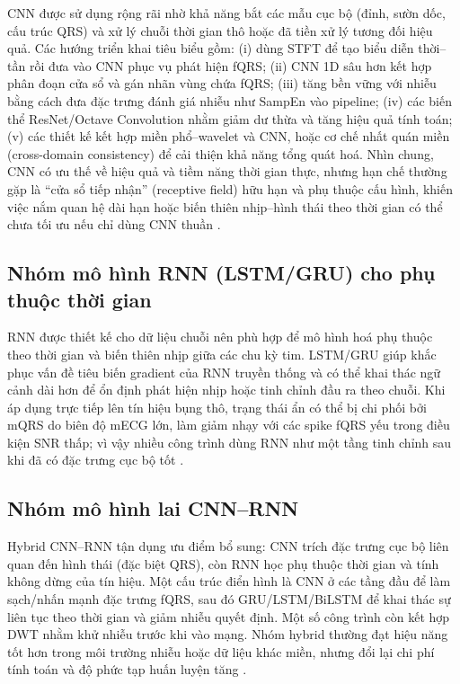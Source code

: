 \documentclass[../DoAn.tex]{subfiles}
\begin{document}
CNN được sử dụng rộng rãi nhờ khả năng bắt các mẫu cục bộ (đỉnh, sườn dốc, cấu trúc QRS) và xử lý chuỗi thời gian thô hoặc đã tiền xử lý tương đối hiệu quả. Các hướng triển khai tiêu biểu gồm: (i) dùng STFT để tạo biểu diễn thời--tần rồi đưa vào CNN phục vụ phát hiện fQRS; (ii) CNN 1D sâu hơn kết hợp phân đoạn cửa sổ và gán nhãn vùng chứa fQRS; (iii) tăng bền vững với nhiễu bằng cách đưa đặc trưng đánh giá nhiễu như SampEn vào pipeline; (iv) các biến thể ResNet/Octave Convolution nhằm giảm dư thừa và tăng hiệu quả tính toán; (v) các thiết kế kết hợp miền phổ--wavelet và CNN, hoặc cơ chế nhất quán miền (cross-domain consistency) để cải thiện khả năng tổng quát hoá. Nhìn chung, CNN có ưu thế về hiệu quả và tiềm năng thời gian thực, nhưng hạn chế thường gặp là “cửa sổ tiếp nhận” (receptive field) hữu hạn và phụ thuộc cấu hình, khiến việc nắm quan hệ dài hạn hoặc biến thiên nhịp--hình thái theo thời gian có thể chưa tối ưu nếu chỉ dùng CNN thuần
\cite{leeFetalQRSDetection2018, caoMorphologyExtractionFetal2022, zhongDeepLearningApproach2018, voEfficientRobustDeep2020}.


\subsection{Nhóm mô hình RNN (LSTM/GRU) cho phụ thuộc thời gian} 
RNN được thiết kế cho dữ liệu chuỗi nên phù hợp để mô hình hoá phụ thuộc theo thời gian và biến thiên nhịp giữa các chu kỳ tim. LSTM/GRU giúp khắc phục vấn đề tiêu biến gradient của RNN truyền thống và có thể khai thác ngữ cảnh dài hơn để ổn định phát hiện nhịp hoặc tinh chỉnh đầu ra theo chuỗi. Khi áp dụng trực tiếp lên tín hiệu bụng thô, trạng thái ẩn có thể bị chi phối bởi mQRS do biên độ mECG lớn, làm giảm nhạy với các spike fQRS yếu trong điều kiện SNR thấp; vì vậy nhiều công trình dùng RNN như một tầng tinh chỉnh sau khi đã có đặc trưng cục bộ tốt
\cite{hochreiterLongShorttermMemory1997, darmawahyuniAccurateFetalQRSComplex2023, darmawahyuniDeepLearningFetal2023}.


\subsection{Nhóm mô hình lai CNN--RNN}
Hybrid CNN--RNN tận dụng ưu điểm bổ sung: CNN trích đặc trưng cục bộ liên quan đến hình thái (đặc biệt QRS), còn RNN học phụ thuộc thời gian và tính không dừng của tín hiệu. Một cấu trúc điển hình là CNN ở các tầng đầu để làm sạch/nhấn mạnh đặc trưng fQRS, sau đó GRU/LSTM/BiLSTM để khai thác sự liên tục theo thời gian và giảm nhiễu quyết định. Một số công trình còn kết hợp DWT nhằm khử nhiễu trước khi vào mạng. Nhóm hybrid thường đạt hiệu năng tốt hơn trong môi trường nhiễu hoặc dữ liệu khác miền, nhưng đổi lại chi phí tính toán và độ phức tạp huấn luyện tăng \cite{ghonchiCommonSpatialPattern2022,darmawahyuniAccurateFetalQRSComplex2023, darmawahyuniDeepLearningFetal2023}.
\end{document}
